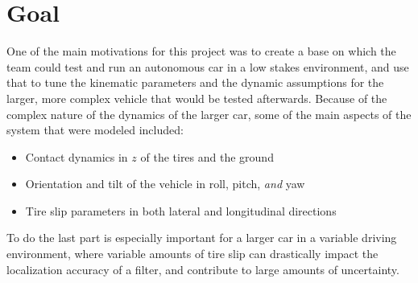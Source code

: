 \section{Goal}


One of the main motivations for this project was to create a base on which the team could test and run an autonomous car in a low stakes environment, and use that to tune the kinematic parameters and the dynamic assumptions for the larger, more complex vehicle that would be tested afterwards. Because of the complex nature of the dynamics of the larger car, some of the main aspects of the system that were modeled included:

\begin{itemize}
  \item Contact dynamics in $z$ of the tires and the ground
  \item Orientation and tilt of the vehicle in roll, pitch, \textit{and} yaw
  \item Tire slip parameters in both lateral and longitudinal directions
\end{itemize}

To do the last part is especially important for a larger car in a variable driving environment, where variable amounts of tire slip can drastically impact the localization accuracy of a filter, and contribute to large amounts of uncertainty.
